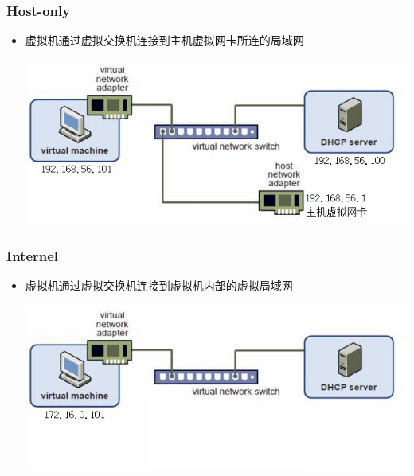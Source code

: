 \documentclass[xcolor=svgnames,bigger,presentation]{beamer}
\begin{document}
\begin{frame}
\frametitle{Host-only}
\label{sec-3-3-3}
\begin{itemize}

\item 虚拟机通过虚拟交换机连接到主机虚拟网卡所连的局域网
\label{sec-3-3-3-1}%
\begin{center}
\includegraphics[width=.9\linewidth]{img/host-only.jpg}
\end{center}

\end{itemize} %
\end{frame}
\begin{frame}
\frametitle{Internel}
\label{sec-3-3-4}
\begin{itemize}

\item 虚拟机通过虚拟交换机连接到虚拟机内部的虚拟局域网
\label{sec-3-3-4-1}%
\begin{center}
\includegraphics[width=.9\linewidth]{img/internal.jpg}
\end{center}

\end{itemize} %
\end{frame}
\end{document}
